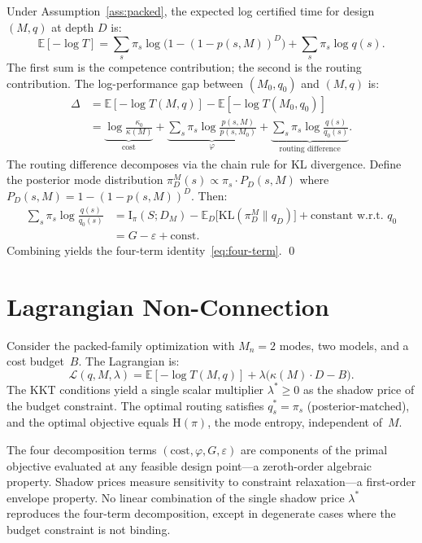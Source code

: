 \documentclass[11pt]{article}
\newcommand{\KL}{\mathrm{KL}}
\newcommand{\E}{\mathbb{E}}
\newcommand{\Mn}{M_n}
\newcommand{\MI}{\mathrm{I}}
\newcommand{\Hent}{\mathrm{H}}
\newcommand{\mismatch}{\varepsilon}
\begin{document}
Under Assumption~\ref{ass:packed}, the expected log certified time for
design $(M, q)$ at depth $D$ is:
\begin{equation}
  \E[-\log T] = \sum_s \pi_s \log\bigl(1 - (1 - p(s,M))^D\bigr)
    + \sum_s \pi_s \log q(s).
\end{equation}
The first sum is the competence contribution; the second is the routing
contribution.  The log-performance gap between $(M_0, q_0)$ and $(M, q)$
is:
\begin{align}
  \Delta &= \E[-\log T(M,q)] - \E[-\log T(M_0, q_0)] \nonumber \\
  &= \underbrace{\log\frac{\kappa_0}{\kappa(M)}}_{\text{cost}}
    + \underbrace{\sum_s \pi_s \log\frac{p(s,M)}{p(s,M_0)}}_{\varphi}
    + \underbrace{\sum_s \pi_s \log\frac{q(s)}{q_0(s)}}_{\text{routing difference}}.
\end{align}
The routing difference decomposes via the chain rule for KL divergence.
Define the posterior mode distribution $\pi_D^M(s) \propto \pi_s \cdot
P_D(s,M)$ where $P_D(s,M) = 1 - (1-p(s,M))^D$.  Then:
\begin{align}
  \sum_s \pi_s \log\frac{q(s)}{q_0(s)}
  &= \MI_\pi(S; D_M)
    - \E_D\bigl[\KL(\pi_D^M \| q_D)\bigr]
    + \text{constant w.r.t.\ } q_0 \nonumber \\
  &= G - \mismatch + \text{const}.
\end{align}
Combining yields the four-term identity~\eqref{eq:four-term}. \qed

\section{Lagrangian Non-Connection}
\label{app:lagrangian}

Consider the packed-family optimization with $\Mn{=}2$ modes, two models,
and a cost budget~$B$.  The Lagrangian is:
\[
  \mathcal{L}(q, M, \lambda) = \E[-\log T(M, q)]
    + \lambda\bigl(\kappa(M) \cdot D - B\bigr).
\]
The KKT conditions yield a single scalar multiplier $\lambda^* \ge 0$
as the shadow price of the budget constraint.  The optimal routing satisfies
$q_s^* = \pi_s$ (posterior-matched), and the optimal objective equals
$\Hent(\pi)$, the mode entropy, independent of~$M$.

The four decomposition terms $(\text{cost}, \varphi, G, \mismatch)$ are
components of the primal objective evaluated at any feasible design
point---a zeroth-order algebraic property.  Shadow prices measure
sensitivity to constraint relaxation---a first-order envelope property.
No linear combination of the single shadow price $\lambda^*$ reproduces
the four-term decomposition, except in degenerate cases where the budget
constraint is not binding.
\end{document}

